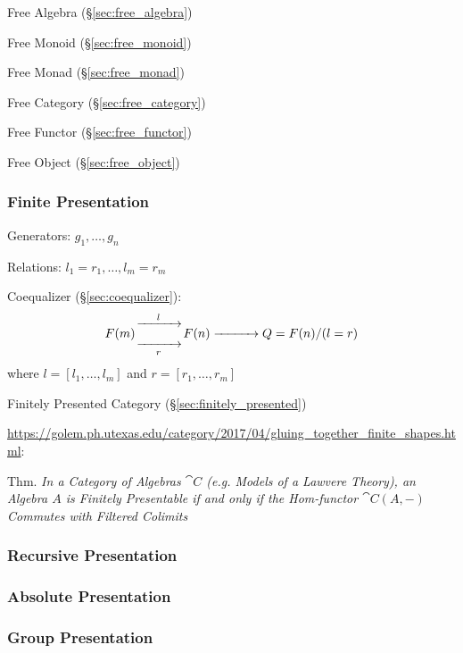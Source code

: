Free Algebra (\S\ref{sec:free_algebra})

Free Monoid (\S\ref{sec:free_monoid})

Free Monad (\S\ref{sec:free_monad})

Free Category (\S\ref{sec:free_category})

Free Functor (\S\ref{sec:free_functor})

Free Object (\S\ref{sec:free_object})



\subsubsection{Finite Presentation}\label{sec:finite_presentation}
\cite{awodey06}

Generators: $g_1, \ldots, g_n$

Relations: $l_1 = r_1, \ldots, l_m = r_m$

Coequalizer (\S\ref{sec:coequalizer}):
\[
  F(m) {\xrightarrow[\quad\quad\quad]{l}
    \atop \xrightarrow[r]{\quad\quad\quad}} F(n)
  \xrightarrow{\quad\quad\quad} Q = F(n) / (l = r)
\]
where $l = [l_1, \ldots, l_m]$ and $r = [r_1, \ldots, r_m]$

Finitely Presented Category (\S\ref{sec:finitely_presented})

\url{https://golem.ph.utexas.edu/category/2017/04/gluing_together_finite_shapes.html}:

Thm. \emph{In a Category of Algebras $\cat{C}$ (e.g. Models of a
  Lawvere Theory), an Algebra $A$ is Finitely Presentable if and only
  if the Hom-functor $\cat{C}(A,-)$ Commutes with Filtered Colimits}



\subsubsection{Recursive Presentation}\label{sec:recursive_presentation}

\subsubsection{Absolute Presentation}\label{sec:absolute_presentation}

\subsubsection{Group Presentation}\label{sec:group_presentation}

